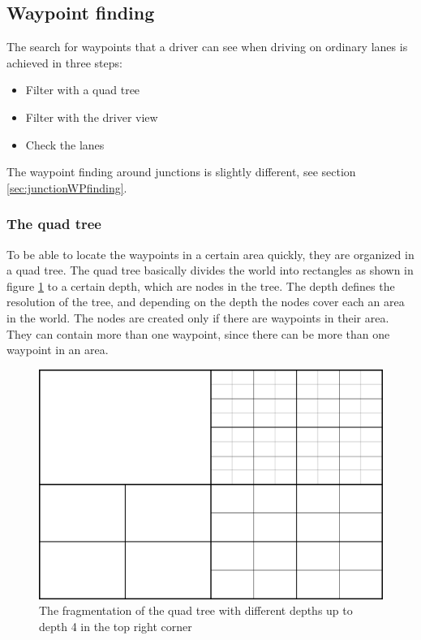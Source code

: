 \subsection{Waypoint finding}

The search for waypoints that a driver can see when driving on ordinary lanes 
is achieved in three steps:

\begin{itemize}
\item Filter with a quad tree
\item Filter with the driver view
\item Check the lanes
\end{itemize}

The waypoint finding around junctions is slightly different, see section 
\ref{sec:junctionWPfinding}.

\subsubsection{The quad tree}
\label{sec:quadTree}

To be able to locate the waypoints in a certain area quickly, they are
organized in a quad tree. The quad tree basically divides the world
into rectangles as shown in figure \ref{fig:quadTree} to a certain
depth, which are nodes in the tree. The depth defines the resolution
of the tree, and depending on the depth the nodes cover each an area
in the world. The nodes are created only if there are waypoints in their
area. They can contain more than one waypoint, since there can be more
than one waypoint in an area.\\

\begin{figure}[H]
\begin{center}
\includegraphics[scale=0.5]{images/quadtree.png}
\end{center}
\caption{The fragmentation of the quad tree with different depths up to depth 
4 in the top right corner}
\label{fig:quadTree}
\end{figure}

